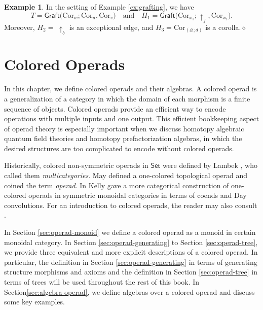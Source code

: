 \documentclass[11pt]{amsbook}
\numberwithin{section}{chapter}
\numberwithin{subsection}{section}
\numberwithin{equation}{section}
\theoremstyle{plain}
\theoremstyle{definition}
\newtheorem{example}[equation]{Example}
\newcommand{\Cor}{\mathrm{Cor}}
\newcommand{\graft}{\mathsf{Graft}}
\newcommand{\dqed}{\hfill$\diamond$}
\newcommand{\Set}{\mathsf{Set}}
\newcommand{\andspace}{\quad\text{and}\quad}
\begin{document}
\begin{example}\label{ex2:grafting}
In the setting of Example \ref{ex:grafting}, we have \[T = \graft\bigl(\Cor_w; \Cor_u,\Cor_v\bigr) \andspace H_1=\graft\bigl(\Cor_{x_1}; \uparrow_f,\Cor_{x_2}\bigr).\] Moreover, $H_2=~\uparrow_b$ is an exceptional edge, and $H_3=\Cor_{(\varnothing;d)}$ is a corolla.\dqed
\end{example}



\chapter{Colored Operads}\label{ch:operads}

In this chapter, we define colored operads and their algebras.  A colored operad is a generalization of a category in which the domain of each morphism is a finite sequence of objects.  Colored operads provide an efficient way to encode operations with multiple inputs and one output.  This efficient bookkeeping aspect of operad theory is especially important when we discuss homotopy algebraic quantum field theories and homotopy prefactorization algebras, in which the desired structures are too complicated to encode without colored operads.

Historically, colored non-symmetric operads in $\Set$ were defined by Lambek \cite{lambek}, who called them \emph{multicategories}.  May \cite{may} defined a one-colored topological operad and coined the term \emph{operad}.  In \cite{kelly} Kelly gave a more categorical construction of one-colored operads in symmetric monoidal categories in terms of coends and Day convolutions.  For an introduction to colored operads, the reader may also consult \cite{bsw,white-yau,yau-operad}.

In Section \ref{sec:operad-monoid} we define a colored operad as a monoid in certain monoidal category.  In Section \ref{sec:operad-generating} to Section \ref{sec:operad-tree}, we provide three equivalent and more explicit descriptions of a colored operad.  In particular, the definition in Section \ref{sec:operad-generating} in terms of generating structure morphisms and axioms and the definition in Section \ref{sec:operad-tree} in terms of trees will be used throughout the rest of this book.  In Section\ref{sec:algebra-operad}, we define algebras over a colored operad and discuss some key examples.  
\end{document}
